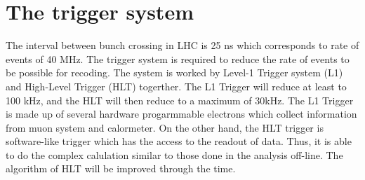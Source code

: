 \section{The trigger system}
The interval between bunch crossing in LHC is 25 ns which corresponds to rate of events of 40 MHz.
The trigger system is required to reduce the rate of events to be possible for recoding.
The system is worked by Level-1 Trigger system (L1) and High-Level Trigger (HLT) togerther.
The L1 Trigger will reduce at least to 100 kHz, and the HLT will then reduce to a maximum of 30kHz.
The L1 Trigger is made up of several hardware progarmmable electrons which collect information from muon system and calormeter.
On the other hand, the HLT trigger is software-like trigger which has the access to the readout of data. 
Thus, it is able to do the complex calulation similar to those done in the analysis off-line. 
The algorithm of HLT will be improved through the time.
 